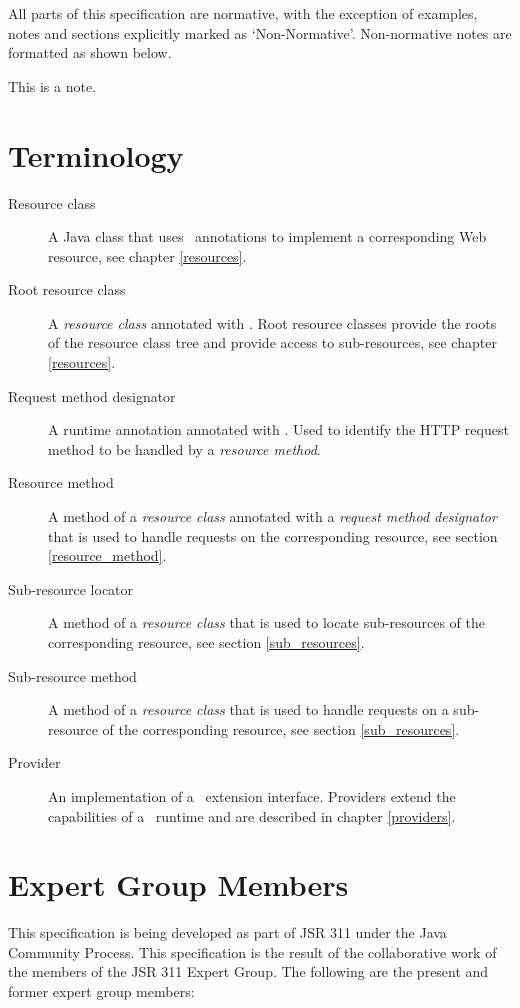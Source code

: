 All parts of this specification are normative, with the exception of examples, notes and sections explicitly marked as `Non-Normative'. Non-normative notes are formatted as shown below.

\begin{nnnote*}
This is a note.
\end{nnnote*}

\section{Terminology}

\begin{description}
\item[Resource class] A Java class that uses \jaxrs\ annotations to implement a corresponding Web resource, see chapter \ref{resources}.
\item[Root resource class] A {\em resource class} annotated with \Path. Root resource classes provide the roots of the resource class tree and provide access to sub-resources, see chapter \ref{resources}.
\item[Request method designator] A runtime annotation annotated with \HttpMethod. Used to identify the HTTP request method to be handled by a {\em resource method}.
\item[Resource method] A method of a {\em resource class} annotated with a {\em request method designator} that is used to handle requests on the corresponding resource, see section \ref{resource_method}.
\item[Sub-resource locator] A method of a {\em resource class} that is used to locate sub-resources of the corresponding resource, see section \ref{sub_resources}.
\item[Sub-resource method] A method of a {\em resource class} that is used to handle requests on a sub-resource of the corresponding resource, see section \ref{sub_resources}.
\item[Provider] An implementation of a \jaxrs\ extension interface. Providers extend the capabilities of a \jaxrs\ runtime and are described in chapter \ref{providers}.
\end{description}

\section{Expert Group Members} 

This specification is being developed as part of JSR 311 under the Java Community Process. This specification is the result of the collaborative work of the members of the JSR 311 Expert Group. The following are the present and former expert group members:

